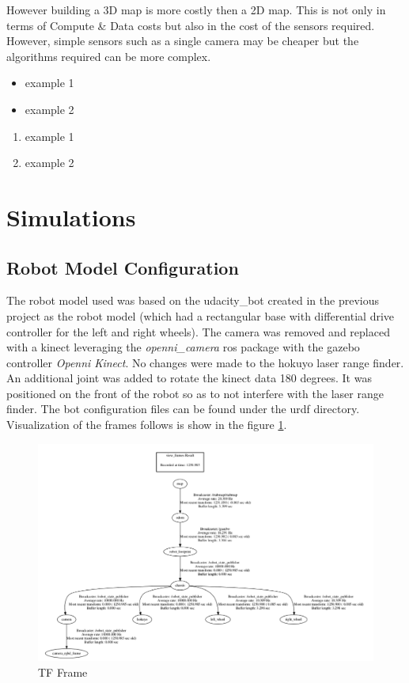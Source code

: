\documentclass[10pt,journal,compsoc]{IEEEtran}
\begin{document}
However building a 3D map is more costly then a 2D map. This is not only in terms of Compute \& Data costs but also in the cost of the sensors required. However, simple sensors such as a single camera may be cheaper but the algorithms required can be more complex.



\begin{itemize}
\item example 1
\item example 2
\end {itemize}

\begin{enumerate}
\item example 1
\item example 2
\end{enumerate}

\section{Simulations}

\subsection{Robot Model Configuration}
The robot model used was based on the udacity\_bot created in the previous project as the  robot model (which had a rectangular base with differential drive controller for the left and right wheels). The camera was removed and replaced with a kinect leveraging the \emph{openni\_camera} ros package with the gazebo controller \emph{Openni Kinect}.
No changes were made to the hokuyo laser range finder.
An additional joint was added to rotate the kinect data 180 degrees. It was positioned on the front of the robot so as to not interfere with the laser range finder.
The bot configuration files can be found under the urdf directory.
Visualization of the frames follows is show in the figure \ref{fig:frame}.

\begin{figure}[thpb]
      \centering
      \includegraphics[width=\linewidth]{images/tfframe}
      \caption{TF Frame}
      \label{fig:frame}
\end{figure}
\end{document}
